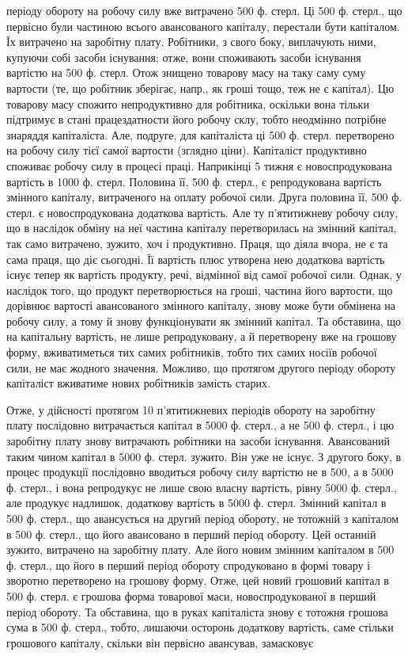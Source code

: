 \parcont{}  %
періоду обороту на робочу силу вже витрачено 500 ф. стерл. Ці 500 ф. стерл.,
що первісно були частиною всього авансованого капіталу, перестали бути
капіталом. Їх витрачено на заробітну плату. Робітники, з свого боку,
виплачують ними, купуючи собі засоби існування; отже, вони споживають
засоби існування вартістю на 500 ф. стерл. Отож знищено товарову
масу на таку саму суму вартости (те, що робітник зберігає, напр., як
гроші тощо, теж не є капітал). Цю товарову масу спожито непродуктивно
для робітника, оскільки вона тільки підтримує в стані працездатности
його робочу склу, тобто неодмінно потрібне знаряддя капіталіста. Але,
подруге, для капіталіста ці 500 ф. стерл. перетворено на робочу силу тієї
самої вартости (зглядно ціни). Капіталіст продуктивно споживає робочу
силу в процесі праці. Наприкінці 5 тижня є новоспродукована вартість
в 1000 ф. стерл. Половина її, 500 ф. стерл., є репродукована вартість змінного
капіталу, витраченого на оплату робочої сили. Друга половина її,
500 ф. стерл. є новоспродукована додаткова вартість. Але ту п’ятитижневу
робочу силу, що в наслідок обміну на неї частина капіталу перетворилась
на змінний капітал, так само витрачено, зужито, хоч і продуктивно.
Праця, що діяла вчора, не є та сама праця, що діє сьогодні. Її
вартість плюс утворена нею додаткова вартість існує тепер як вартість
продукту, речі, відмінної від самої робочої сили. Однак, у наслідок того,
що продукт перетворюється на гроші, частина його вартости, що дорівнює
вартості авансованого змінного капіталу, знову може бути
обмінена на робочу силу, а тому й знову функціонувати як змінний капітал.
Та обставина, що на капітальну вартість, не лише репродуковану,
а й перетворену вже на грошову форму, вживатиметься тих самих робітників,
тобто тих самих носіїв робочої сили, не має жодного значення.
Можливо, що протягом другого періоду обороту капіталіст вживатиме
нових робітників замість старих.

Отже, у дійсності протягом 10 п’ятитижневих періодів обороту на
заробітну плату послідовно витрачається капітал в 5000 ф. стерл., а
не 500 ф. стерл., і цю заробітну плату знову витрачають робітники
на засоби існування. Авансований таким чином капітал в 5000
ф. стерл. зужито. Він уже не існує. З другого боку, в процес продукції
послідовно вводиться робочу силу вартістю не в 500, а в 5000 ф. стерл.,
і вона репродукує не лише свою власну вартість, рівну 5000 ф. стерл.,
але продукує надлишок, додаткову вартість в 5000 ф. стерл. Змінний
капітал в 500 ф. стерл., що авансується на другий період обороту, не тотожній
з капіталом в 500 ф. стерл., що його авансовано в перший період
обороту. Цей останній зужито, витрачено на заробітну плату. Але його
 новим змінним капіталом в 500 ф. стерл., що його в перший
період обороту спродуковано в формі товару і зворотно перетворено
на грошову форму. Отже, цей новий грошовий капітал в 500 ф. стерл. є
грошова форма товарової маси, новоспродукованої в перший період обороту.
Та обставина, що в руках капіталіста знову є тотожня грошова
сума в 500 ф. стерл., тобто, лишаючи осторонь додаткову вартість, саме
стільки грошового капіталу, скільки він первісно авансував, замасковує
\parbreak{}  %
